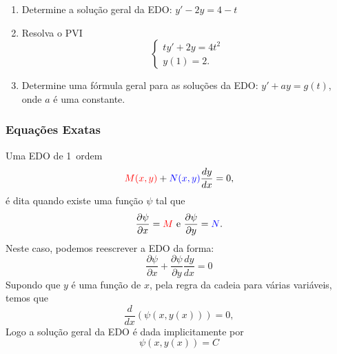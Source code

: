\begin{frame}
\begin{casa}
\begin{enumerate}
\item Determine a solução geral da EDO: $y'-2y=4-t$

\item Resolva o PVI 
\[\begin{cases}
ty'+2y=4t^2\\
y(1)=2.
\end{cases}\]

\item Determine uma fórmula geral para as soluções da EDO: $y'+ay=g(t)$, onde $a$ é uma constante.
\end{enumerate}
\end{casa}
\end{frame}




%
%
%
%
%




\begin{frame}
\frametitle{ Equações Exatas}

Uma EDO de 1\fm\ ordem 
\[{\color{red}M(x,y)}+{\color{blue}N(x,y)}\frac{dy}{dx}=0,\]
é dita  quando existe uma função $\psi$ tal que 
\[\frac{\partial \psi}{\partial x}={\color{red}M} \text{ e } \frac{\partial \psi}{\partial y}={\color{blue}N}.\]
Neste caso, podemos reescrever a EDO da forma:
\[\frac{\partial \psi}{\partial x}+\frac{\partial \psi}{\partial y}\frac{dy}{dx}=0\]
Supondo que $y$ é uma função de $x$, pela regra da cadeia para várias variáveis, temos que
\[\frac{d}{dx}(\psi(x,y(x)))=0,\]
Logo a solução geral da EDO é dada implicitamente por
\[\psi(x,y(x))=C\]

\end{frame}


